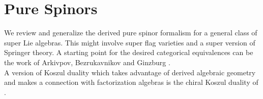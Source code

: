 \section{Pure Spinors}

We review and generalize the derived pure spinor formalism for a general class
of super Lie algebras. This might involve super flag varieties and a super
version of Springer theory. A starting point for the desired categorical
equivalences can be the work of Arkivpov, Bezrukavnikov and Ginzburg
\cite{Arkhipov03}.\\
A version of Koszul duality which takes advantage of derived algebraic geometry and
makes a connection with factorization algebras is the chiral Koszul duality of \cite{Francis11}.
